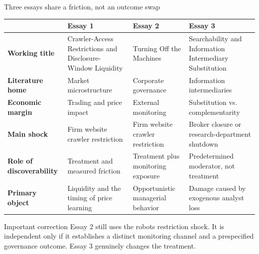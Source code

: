 \documentclass[aspectratio=169,10pt]{beamer}
\begin{document}
\begin{frame}[t]{Three essays share a friction, not an outcome swap}
\scriptsize
\renewcommand{\arraystretch}{1.20}
\setlength{\tabcolsep}{0.11cm}
\begin{tabularx}{\textwidth}{>{\bfseries\RaggedRight\arraybackslash}p{2.25cm} >{\RaggedRight\arraybackslash}X >{\RaggedRight\arraybackslash}X >{\RaggedRight\arraybackslash}X}
\toprule
 & \textbf{Essay 1} & \textbf{Essay 2} & \textbf{Essay 3} \\
\midrule
Working title & Crawler-Access Restrictions and Disclosure-Window Liquidity & Turning Off the Machines & Searchability and Information Intermediary Substitution \\
Literature home & Market microstructure & Corporate governance & Information intermediaries \\
Economic margin & Trading and price impact & External monitoring & Substitution vs. complementarity \\
Main shock & Firm website crawler restriction & Firm website crawler restriction & Broker closure or research-department shutdown \\
Role of discoverability & Treatment and measured friction & Treatment plus monitoring exposure & Predetermined moderator, not treatment \\
Primary object & Liquidity and the timing of price learning & Opportunistic managerial behavior & Damage caused by exogenous analyst loss \\
\bottomrule
\end{tabularx}

\vspace{0.20cm}
\begin{alertblock}{Important correction}
\footnotesize
Essay 2 still uses the robots restriction shock. It is independent only if it establishes a distinct monitoring channel and a prespecified governance outcome. Essay 3 genuinely changes the treatment.
\end{alertblock}
\end{frame}
\end{document}
